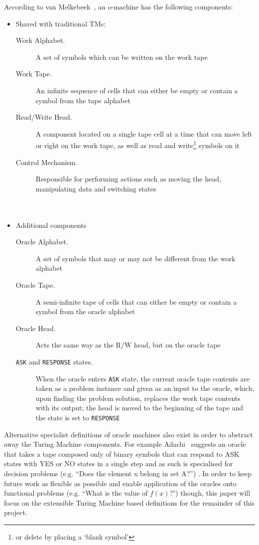 \documentclass[12pt]{article}
\begin{document}
				According to van Melkebeek~\cite{Melkebeek}, an o-machine has the following components:\clearpage
				\begin{multicols}{2}
					\begin{itemize}
						\item Shared with traditional TMs:
						\begin{description}
							\item[Work Alphabet.] A set of symbols which can be written on the work tape
							\item[Work Tape.] An infinite sequence of cells that can either be empty or contain a symbol from the tape alphabet
							\item[Read/Write Head.] A component located on a single tape cell at a time that can move left or right on the work tape, as well as read and write\footnote{or delete by placing a `blank symbol'} symbols on it
							\item[Control Mechanism.] Responsible for performing actions such as moving the head, manipulating data and switching states\\\\\\
						\end{description}\columnbreak
						\item Additional components
						\begin{description}
							\item[Oracle Alphabet.] A set of symbols that may or may not be different from the work alphabet
							\item[Oracle Tape.] A semi-infinite tape of cells that can either be empty or contain a symbol from the oracle alphabet
							\item[Oracle Head.] Acts the same way as the R/W head, but on the oracle tape
							\item[\texttt{ASK} and \texttt{RESPONSE} states.] When the oracle enters \texttt{ASK} state, the current oracle tape contents are taken as a problem instance and given as an input to the oracle, which, upon finding the problem solution, replaces the work tape contents with its output; the head is moved to the beginning of the tape and the state is set to \texttt{RESPONSE}
						\end{description}
					\end{itemize}
				\end{multicols}
			
			Alternative specialist definitions of oracle machines also exist in order to abstract away the Turing Machine components. For example Adachi~\cite{adachi1990foundations} suggests an oracle that takes a tape composed only of binary symbols that can respond to ASK states with YES or NO states in a single step and as such is specialised for decision problems (e.g. ``Does the element x belong in set A?'') . In order to keep future work as flexible as possible and enable application of the oracles onto functional problems (e.g. ``What is the value of $ f(x) $?") though, this paper will focus on the extensible Turing Machine based definitions for the remainder of this project.
	
\end{document}
